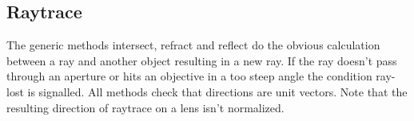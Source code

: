 \documentclass[twocolumn,DIV20]{scrartcl}
\begin{document}
\subsection{Raytrace}
The generic methods intersect, refract and reflect do the obvious
calculation between a ray and another object resulting in a new
ray. If the ray doesn't pass through an aperture or hits an objective
in a too steep angle the condition ray-lost is signalled. All methods
check that directions are unit vectors. Note that the resulting
direction of raytrace on a lens isn't normalized.
 
\end{document}
